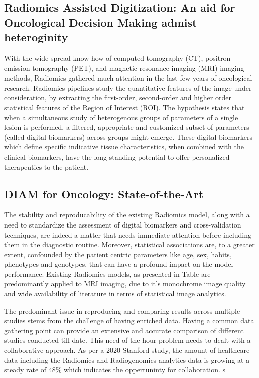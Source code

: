 \documentclass[10pt,journal,compsoc]{IEEEtran}
\begin{document}
\subsection{Radiomics Assisted Digitization: An aid for Oncological Decision Making admist heteroginity}

With the wide-spread know how of computed tomography (CT), positron emission tomography (PET), and magnetic resonance imaging (MRI) imaging methods, Radiomics gathered much attention in the last few years of oncological research. Radiomics pipelines study the quantitative features of the image under consideration, by extracting the first-order, second-order and higher order statistical features of the Region of Interest (ROI). The hypothesis states that when a simultaneous study of heterogenous groups of parameters of a single lesion is performed, a filtered, appropriate and customized subset of parameters (called digital biomarkers) across groups might emerge. These digital biomarkers which define specific indicative tissue characteristics, when combined with the clinical biomarkers, have the long-standing potential to offer personalized therapeutics to the patient.

\subsection{DIAM for Oncology: State-of-the-Art}
The stability and reproducability of the existing Radiomics model, along with a need to standardize the assessment of digital biomarkers and cross-validation techniques, are indeed a matter that needs immediate attention before including them in the diagnostic routine. Moreover, statistical associations are, to a greater extent, confounded by the patient centric parameters like age, sex, habits, phenotypes and genotypes, that can have a profound impact on the model performance. Existing Radiomics models, as presented in Table are predominantly applied to MRI imaging, due to it's monochrome image quality and wide availability of literature in terms of statistical image analytics.

The predominant issue in reproducing and comparing results across multiple studies stems from the challenge of having enriched data. Having a common data gathering point can provide an extensive and accurate comparison of different studies conducted till date. This need-of-the-hour problem needs to dealt with a collaborative approach. As per a 2020 Stanford study, the amount of healthcare data including the Radiomics and Radiogenomics analytics data is growing at a steady rate of 48\% which indicates the oppertuninty for collaboration. s
\end{document}
